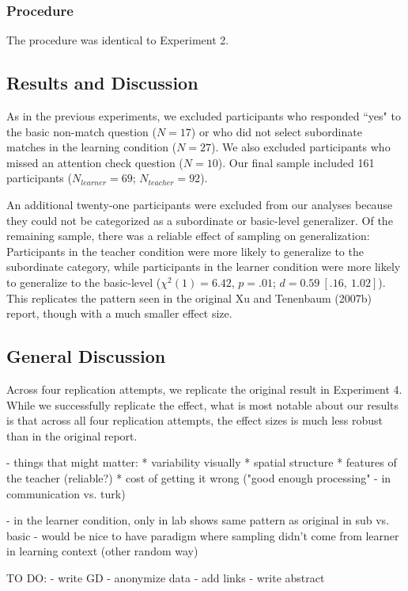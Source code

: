 \documentclass[man]{apa2}
\begin{document}
\subsubsection{Procedure}
The procedure was identical to Experiment 2.

\subsection{Results and Discussion}

As in the previous experiments, we excluded participants who responded ``yes" to the basic non-match question ($N=17$) or who did not select subordinate matches in the learning condition ($N = 27$). We also excluded participants who missed an attention check question ($N = 10$). Our final sample included 161 participants ($N_{learner} = 69$; $N_{teacher} = 92$).

An additional twenty-one participants were excluded from our analyses because they could not be categorized as a subordinate or basic-level generalizer. Of the remaining sample, there was a reliable effect of sampling on generalization: Participants in the teacher condition were more likely to generalize to the subordinate category, while participants in the learner condition were more likely to generalize to the basic-level ($\chi^2(1) = 6.42$,  $p = .01$; $d = 0.59\ [.16,\ 1.02]$). This replicates the pattern seen in the original Xu and Tenenbaum (2007b) report, though with a much smaller effect size.

\subsection{General Discussion}
Across four replication attempts, we replicate the original result in Experiment 4. While we successfully replicate the effect, what is most notable about our results is that across all four replication attempts, the effect sizes is much less robust than in the original report. 

- things that might matter:
* variability visually
* spatial structure
* features of the teacher (reliable?)
* cost of getting it wrong ("good enough processing" - in communication vs. turk) 

-  in the learner condition, only in lab shows same pattern as original in sub vs. basic
- would be nice to have paradigm where sampling didn't come from learner in learning context (other random way)

TO DO:
- write GD
- anonymize data
- add links
- write abstract
\end{document}
